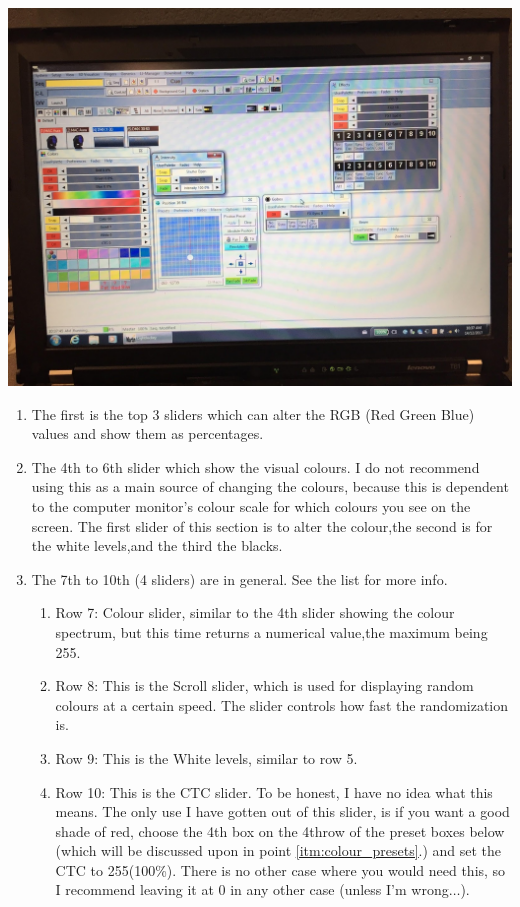 \documentclass{article}
\begin{document}
\begin{enumerate}
\begin{center}
        \includegraphics[width=\textwidth, keepaspectratio]{LightJockey_Screenshot.jpg}
    \end{center}
    \begin{enumerate}
        \item The first is the top 3 sliders which can alter the RGB (Red Green Blue) values and show them as percentages.
        \item The 4th to 6th slider which show the visual colours. I do not recommend using this as a main source of changing the colours, because this is dependent to the computer monitor’s colour scale for which colours you see on the screen. The first slider of this section is to alter the colour,the second is for the white levels,and the third the blacks.
        \item The 7th to 10th (4 sliders) are in general. See the list for more info.
        \begin{enumerate}
            \item Row 7: Colour slider, similar to the 4th slider showing the colour spectrum, but this time returns a numerical value,the maximum being 255.
            \item Row 8: This is the Scroll slider, which is used for displaying random colours at a certain speed. The slider controls how fast the randomization is.
            \item Row 9: This is the White levels, similar to row 5.
            \item Row 10: This is the CTC slider. To be honest, I have no idea what this means. The only use I have gotten out of this slider, is if you want a good shade of red, choose the 4th box on the 4throw of the preset boxes below (which will be discussed upon in point \underline{\ref{itm:colour_presets}}.) and set the CTC to 255(100\%). There is no other case where you would need this, so I recommend leaving it at 0 in any other case (unless I’m wrong$\ldots$).

\end{enumerate}
\end{enumerate}
\end{enumerate}
\end{document}
